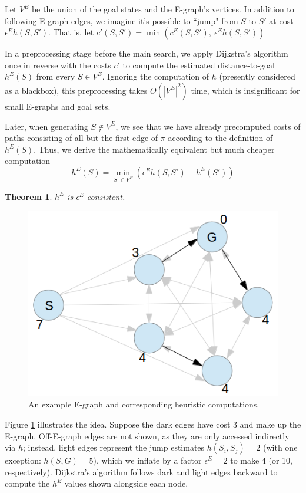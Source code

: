 \documentclass[letterpaper]{article}
\newtheorem{thm}{Theorem}
\begin{document}
Let $V^E$ be the union of the goal states and the E-graph's vertices.
In addition to following E-graph edges, we imagine it's possible to ``jump" from $S$ to $S'$ at cost $\epsilon^E h(S,S')$.
That is, let $c'(S,S') = \min\left(c^E(S,S'),~\epsilon^E h(S,S')\right)$


In a preprocessing stage before the main search, we apply Dijkstra's algorithm once in reverse with the costs $c'$ to compute the estimated distance-to-goal $h^E(S)$ from every $S\in V^E$. Ignoring the computation of $h$ (presently considered as a blackbox), this preprocessing takes $O(|V^E|^2)$ time, which is insignificant for small E-graphs and goal sets.

Later, when generating $S \notin V^E$, we see that we have already precomputed costs of paths consisting of all but the first edge of $\pi$ according to the definition of $h^E(S)$. Thus, we derive the mathematically equivalent but much cheaper computation
\[h^E(S) = \min_{S'\in V^E} \left(\epsilon^E h(S,S') + h^E(S')\right)\]

\begin{thm}$h^E$ is $\epsilon^E$-consistent. \cite{phillips2012graphs}\end{thm}

\begin{figure}
	\begin{center}
	\includegraphics[scale=0.5]{Pentagon.png}
	\end{center}
	\caption{An example E-graph and corresponding heuristic computations.}
	\label{fig:example}
\end{figure}

Figure \ref{fig:example} illustrates the idea. Suppose the dark edges have cost 3 and make up the E-graph. Off-E-graph edges are not shown, as they are only accessed indirectly via $h$; instead, light edges represent the jump estimates $h(S_i,S_j) = 2$ (with one exception: $h(S,G) = 5$), which we inflate by a factor $\epsilon^E=2$ to make 4 (or 10, respectively). Dijkstra's algorithm follows dark and light edges backward to compute the $h^E$ values shown alongside each node.
\end{document}
